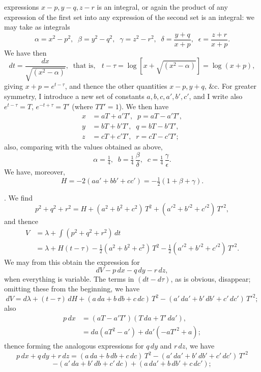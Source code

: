 \documentclass[11pt,a4paper]{article}
\begin{document}
expressions $x - p, y - q, z - r$ is an integral, or again the product of any expression of the first set into any expression of the second set is an integral: we may take as integrals
\[
\alpha = x^{2} - p^{2}, \;\; \beta = y^{2} - q^{2}, \;\; \gamma = z^{2} - r^{2}, \;\; \delta = \frac{y + q}{x + p}, \;\; \epsilon = \frac{z + r}{x + p}.
\]
We have then
\[
dt = \frac{dx}{\sqrt{(x^{2} - \alpha)}}, \;\; \text{that is, } \;\; t - \tau = \log\!\left[ x + \sqrt{(x^{2} - \alpha)} \right] = \log(x + p),
\]
giving $x + p = e^{t - \tau}$, and thence the other quantities $x - p, y + q$, \&c. For greater symmetry, I introduce a new set of constants $a, b, c, a', b', c'$, and I write also $e^{t - \tau} = T$, $e^{-t + \tau} = T'$ (where $TT' = 1$). We then have
\[
\begin{aligned}
x &= aT + a'T', \;\; p = aT - a'T', \\
y &= bT + b'T', \;\; q = bT - b'T', \\
z &= cT + c'T', \;\; r = cT - c'T';
\end{aligned}
\]
also, comparing with the values obtained as above,
\[
\alpha = \tfrac{1}{4}, \;\; b = \tfrac{1}{4}\,\frac{\beta}{\delta}, \;\; c = \tfrac{1}{4}\,\frac{\gamma}{\epsilon}.
\]
We have, moreover,
\[
H = - 2(aa' + bb' + cc') = -\tfrac{1}{2}(1 + \beta + \gamma).
\]

\medskip

. We find
\[
p^{2} + q^{2} + r^{2} = H + (a^{2} + b^{2} + c^{2})\,T^{2} + (a'^{2} + b'^{2} + c'^{2})\,T'^{2},
\]
and thence
\[
\begin{aligned}
V &= \lambda + \int (p^{2} + q^{2} + r^{2})\,dt \\
&= \lambda + H(t - \tau) - \tfrac{1}{2}(a^{2} + b^{2} + c^{2})\,T^{2} - \tfrac{1}{2}(a'^{2} + b'^{2} + c'^{2})\,T'^{2}.
\end{aligned}
\]
We may from this obtain the expression for
\[
dV - p\,dx - q\,dy - r\,dz,
\]
when everything is variable. The terms in $(dt - d\tau)$, as is obvious, disappear; omitting these from the beginning, we have
\[
dV = d\lambda + (t - \tau)\,dH + (a\,da + b\,db + c\,dc)\,T^{2} - (a'\,da' + b'\,db' + c'\,dc')\,T'^{2};
\]
also
\[
\begin{aligned}
p\,dx &= (aT - a'T')(T\,da + T'\,da'), \\
&= da(aT^{2} - a') + da'(- aT'^{2} + a);
\end{aligned}
\]
thence forming the analogous expressions for $q\,dy$ and $r\,dz$, we have
\[
p\,dx + q\,dy + r\,dz = (a\,da + b\,db + c\,dc)\,T^{2} - (a'\,da' + b'\,db' + c'\,dc')\,T'^{2}
\]
\[
- (a'\,da + b'\,db + c'\,dc) + (a\,da' + b\,db' + c\,dc');
\]
\end{document}
